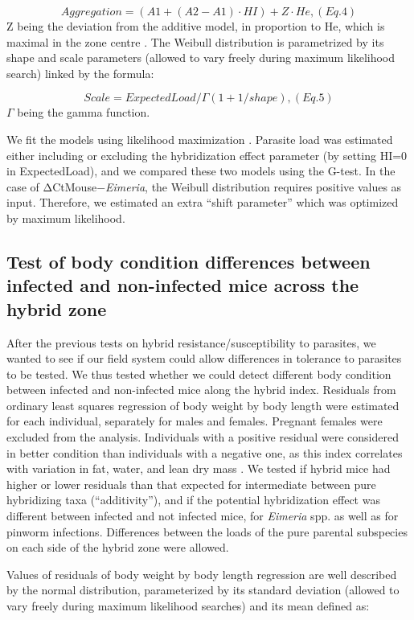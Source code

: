 \[Aggregation=(A1 + (A2 − A1) · HI) + Z · He ,           (Eq. 4)\] 
Z being the deviation from the additive model, in proportion to He, which is maximal in the zone centre \citep{baird_where_2012}. The Weibull distribution is parametrized by its shape and scale parameters (allowed to vary freely during maximum likelihood search) linked by the formula:

\[Scale=ExpectedLoad / \Gamma (1 + 1/ shape) ,           (Eq. 5)\]
$\Gamma$ being the gamma function. 
\par We fit the models using likelihood maximization \parencite[using the R package mle2;][]{bolker_bbmle_2017}. Parasite load was estimated either including or excluding the hybridization effect parameter (by setting HI=0 in ExpectedLoad), and we compared these two models using the G-test. In the case of ΔCtMouse−\textit{Eimeria}, the Weibull distribution requires positive values as input. Therefore, we estimated an extra “shift parameter” which was optimized by maximum likelihood.

\subsection{Test of body condition differences between infected and non-infected mice across the hybrid zone}
After the previous tests on hybrid resistance/susceptibility to parasites, we wanted to see if our field system could allow differences in tolerance to parasites to be tested. We thus tested whether we could detect different body condition between infected and non-infected mice along the hybrid index. Residuals from ordinary least squares regression of body weight by body length were estimated for each individual, separately for males and females. Pregnant females were excluded from the analysis. Individuals with a positive residual were considered in better condition than individuals with a negative one, as this index correlates with variation in fat, water, and lean dry mass \citep{schulte-hostedde_restitution_2005}. We tested if hybrid mice had higher or lower residuals than that expected for intermediate between pure hybridizing taxa (“additivity”), and if the potential hybridization effect was different between infected and not infected mice, for \textit{Eimeria} spp. as well as for pinworm infections. Differences between the loads of the pure parental subspecies on each side of the hybrid zone were allowed.
\par Values of residuals of body weight by body length regression are well described by the normal distribution, parameterized by its standard deviation (allowed to vary freely during maximum likelihood searches) and its mean defined as:

